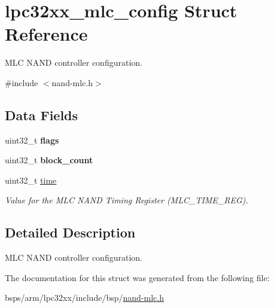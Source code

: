\hypertarget{structlpc32xx__mlc__config}{}\section{lpc32xx\+\_\+mlc\+\_\+config Struct Reference}
\label{structlpc32xx__mlc__config}


M\+LC N\+A\+ND controller configuration.  




{\ttfamily \#include $<$nand-\/mlc.\+h$>$}

\subsection*{Data Fields}
\begin{DoxyCompactItemize}
\item 
\mbox{\label{structlpc32xx__mlc__config_a0ba73125780a7e983d64fd327bc1f76c}} 
uint32\+\_\+t {\bfseries flags}
\item 
\mbox{\label{structlpc32xx__mlc__config_af8d44725e2986aef515f1ee95406854b}} 
uint32\+\_\+t {\bfseries block\+\_\+count}
\item 
\mbox{\label{structlpc32xx__mlc__config_abbf69a8f07ce2fef21e7e1b8ab0a8ef3}} 
uint32\+\_\+t \mbox{\hyperlink{structlpc32xx__mlc__config_abbf69a8f07ce2fef21e7e1b8ab0a8ef3}{time}}
\begin{DoxyCompactList}\small\item\em Value for the M\+LC N\+A\+ND Timing Register (M\+L\+C\+\_\+\+T\+I\+M\+E\+\_\+\+R\+EG). \end{DoxyCompactList}\end{DoxyCompactItemize}


\subsection{Detailed Description}
M\+LC N\+A\+ND controller configuration. 

The documentation for this struct was generated from the following file\+:\begin{DoxyCompactItemize}
\item 
bsps/arm/lpc32xx/include/bsp/\mbox{\hyperlink{nand-mlc_8h}{nand-\/mlc.\+h}}\end{DoxyCompactItemize}

